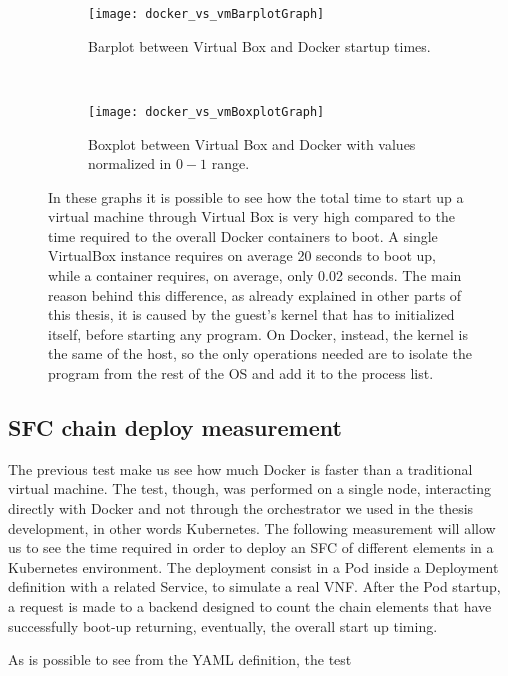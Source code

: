 \begin{figure}[t]
    \centering
    \begin{subfigure}[b]{0.4\textwidth}
        \texttt{[image: docker\_vs\_vmBarplotGraph]}
        \caption{Barplot between Virtual Box and Docker startup times.}
        \label{chap:tests:sec:dockervsvb:img:barplot}
    \end{subfigure}
    ~
    \begin{subfigure}[b]{0.4\textwidth}
        \texttt{[image: docker\_vs\_vmBoxplotGraph]}
        \caption{Boxplot between Virtual Box and Docker with values normalized 
in $0-1$ range.}
        \label{chap:tests:sec:dockervsvb:img:boxplot}
    \end{subfigure}
    \caption[Virtual Box vs Docker start up comparison]{In these graphs it is 
possible to see how the total time to start up a virtual machine through Virtual 
Box is very high compared to the time required to the overall Docker containers 
to boot. A single VirtualBox instance requires on average 20 seconds to boot up, 
while a container requires, on average, only 0.02 seconds. The main reason 
behind this difference, as already explained in other parts of this thesis, it 
is caused by the guest's kernel that has to initialized itself, before starting 
any program. On Docker, instead, the kernel is the same of the host, so the only 
operations needed are to isolate the program from the rest of the OS and add it 
to the process list.}
    \label{chap:tests:sec:dockervsvb:subimg:plots}
\end{figure}

\subsection{SFC chain deploy measurement}

The previous test make us see how much Docker is faster than a traditional
virtual machine. The test, though, was performed on a single node, interacting
directly with Docker and not through the orchestrator we used in the thesis
development, in other words Kubernetes. The following measurement will allow us
to see the time required in order to deploy an SFC of different elements in a
Kubernetes environment. The deployment consist in a Pod inside a Deployment
definition with a related Service, to simulate a real VNF. After the Pod
startup, a request is made to a backend designed to count the chain elements
that have successfully boot-up returning, eventually, the overall start up 
timing.



As is possible to see from the YAML definition, the test %
